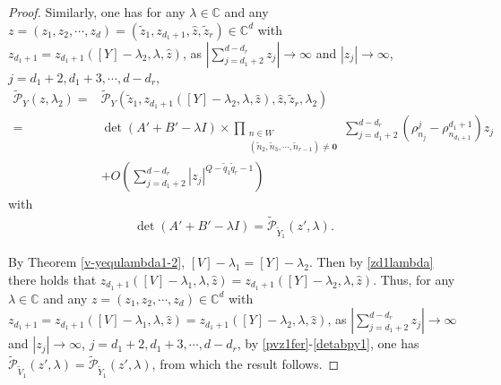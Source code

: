 \documentclass[10pt,a4paper]{amsart}
\def\C{{\mathbb C}}
\newcommand{\abs}[1]{\left\lvert #1 \right\rvert}
\begin{document}
\begin{proof}
Similarly, one has
for any $\lambda\in\C$ and any $z=(z_1,z_2,\cdots,z_d)=(\tilde{z}_1,z_{d_1+1},\hat{z},\tilde{z}_r)\in\C^d$ with $z_{d_1+1}=z_{d_1+1}([Y]-\lambda_2,\lambda,\hat{z})$,
as $\abs{\sum_{j=d_1+2}^{d-d_r}z_j}\to\infty$
and $\abs{z_j}\to\infty$, $j=d_1+2,d_1+3,\cdots,d-d_r$,
\begin{align}
\tilde{\mathcal{P}}_Y(z,\lambda_2)=&\tilde{\mathcal{P}}_Y(\tilde{z}_1,z_{d_1+1}([Y]-\lambda_2,\lambda,\hat{z}),\hat{z},\tilde{z}_r,\lambda_2)\label{pyz1fer}\\
=&\det(A'+B'-\lambda I)\times\prod_{\substack{n\in W\\(\tilde{n}_2,\tilde{n}_3,\cdots,\tilde{n}_{r-1})\neq \mathbf{0}}}\sum_{j={d_1+2}}^{d-d_r}\left(\rho^j_{n_j}-\rho^{d_1+1}_{n_{d_1+1}}\right)z_j\nonumber\\
&+O\left(\sum_{j=d_1+2}^{d-d_r}\abs{z_j}^{Q-\tilde{q}_1\tilde{q}_r-1}\right)\nonumber
\end{align}
with
\begin{align}
\det(A'+B'-\lambda I)=\tilde{\mathcal{P}}_{\tilde{Y}_1}(z',\lambda).\label{detabpy1}
\end{align}

By Theorem \ref{v-yequlambda1-2}, $[V]-\lambda_1=[Y]-\lambda_2$. Then by \eqref{zd1lambda} there holds that $z_{d_1+1}([V]-\lambda_1,\lambda,\hat{z})=z_{d_1+1}([Y]-\lambda_2,\lambda,\hat{z})$.
Thus, for any $\lambda\in\C$ and any $z=(z_1,z_2,\cdots,z_d)\in\C^d$ with $z_{d_1+1}=z_{d_1+1}([V]-\lambda_1,\lambda,\hat{z})=z_{d_1+1}([Y]-\lambda_2,\lambda,\hat{z})$,
as $\abs{\sum_{j=d_1+2}^{d-d_r}z_j}\to\infty$
and $\abs{z_j}\to\infty$, $j=d_1+2,d_1+3,\cdots,d-d_r$, by \eqref{pvz1fer}-\eqref{detabpy1}, one has $\tilde{\mathcal{P}}_{\tilde{V}_1}(z',\lambda)=\tilde{\mathcal{P}}_{\tilde{Y}_1}(z',\lambda)$, from which the result follows.
\end{proof}
\end{document}

